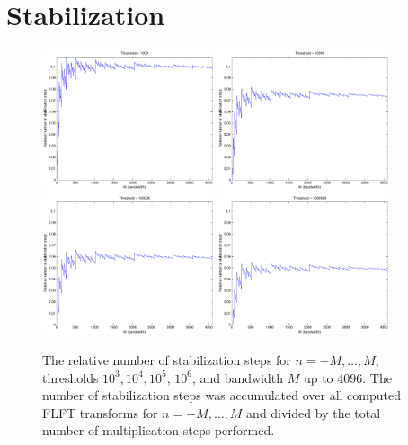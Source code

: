 \section{Stabilization}
\label{NFSFT:Stabilization}
\begin{figure}[tb]
  \centering
   \subfigure
     {\includegraphics[width=0.45\textwidth]{images/stabilization1000}}\hfill
   \subfigure
     {\includegraphics[width=0.45\textwidth]{images/stabilization10000}}\\
   \subfigure
     {\includegraphics[width=0.45\textwidth]{images/stabilization100000}}\hfill
   \subfigure
     {\includegraphics[width=0.45\textwidth]{images/stabilization1000000}}\\
  \caption{The relative number of stabilization steps for $n=-M,\ldots,M$, 
  thresholds $10^3, 10^4, 10^5$, $10^6$, and bandwidth $M$ up to $4096$.
  The number of stabilization steps was accumulated over all computed 
  FLFT transforms for $n=-M,\ldots,M$ and divided by the total number of
  multiplication steps performed.}
  \label{NFSFT:figure:stabilization}
\end{figure}
